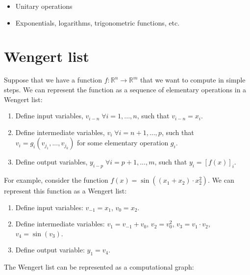 \begin{itemize}
    \item Unitary operations
    \item Exponentials, logarithms, trigonometric functions, etc.
\end{itemize}


\section{Wengert list}

Suppose that we have a function $f: \mathbb{R}^n \to \mathbb{R}^m$ that we want to
compute in simple steps. We can represent the function as a sequence of elementary operations
in a Wengert list:

\begin{enumerate}
    \item Define input variables, $v_{i-n} \; \forall i = 1, ..., n$, such that $v_{i-n} = x_i$.
    \item Define intermediate variables, $v_i \; \forall i = n+1, ..., p$, such that $v_i = g_i(v_{j_1}, ..., v_{j_k})$
    for some elementary operation $g_i$.
    \item Define output variables, $y_{i-p} \; \forall i = p+1, ..., m$, such that $y_i = [f(x)]_i$.
\end{enumerate}

For example, consider the function $f(x) = \sin((x_1 + x_2) \cdot x_2^2)$. We can represent
this function as a Wengert list:

\begin{enumerate}
    \item Define input variables: $v_{-1} = x_1$, $v_0 = x_2$.
    \item Define intermediate variables: $v_1 = v_{-1} + v_0$, $v_2 = v_0^2$, $v_3 = v_1 \cdot v_2$, $v_4 = \sin(v_3)$.
    \item Define output variable: $y_1 = v_4$.
\end{enumerate}

The Wengert list can be represented as a computational graph:

